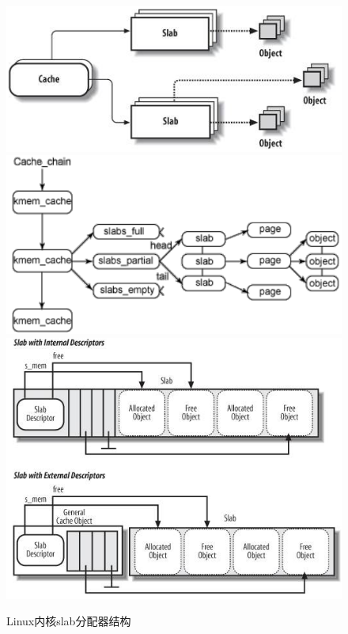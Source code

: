 \begin{figure}[ht]
	\begin{center}
		\includegraphics[keepaspectratio,width=0.3\paperwidth]{Pictures/Kernel/LinuxSlabAllocator.png}
		\includegraphics[keepaspectratio,width=0.3\paperwidth]{Pictures/Kernel/LinuxKmemSlab.png}
		\includegraphics[keepaspectratio,width=0.3\paperwidth]{Pictures/Kernel/SlabAndObjects.png}
	    \caption{Linux内核slab分配器结构}
	\label{fig:LinuxSlabAllocator}
	\end{center}
\end{figure}



